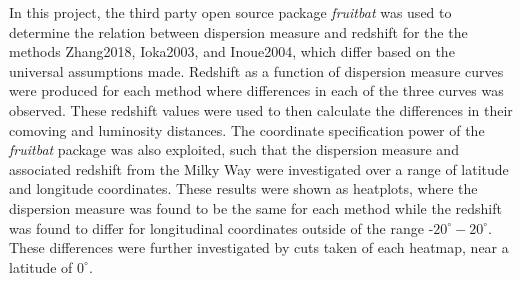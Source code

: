 \documentclass{article}
\begin{document}
In this project, the third party open source package \emph{fruitbat} was used to determine the relation between dispersion measure and redshift for the the methods Zhang2018, Ioka2003, and Inoue2004, which differ based on the universal assumptions made. Redshift as a function of dispersion measure curves were produced for each method where differences in each of the three curves was observed. These redshift values were used to then calculate the differences in their comoving and luminosity distances. The coordinate specification power of the \emph{fruitbat} package was also exploited, such that the dispersion measure and associated redshift from the Milky Way were investigated over a range of latitude and longitude coordinates. These results were shown as heatplots, where the dispersion measure was found to be the same for each method while the redshift was found to differ for longitudinal coordinates outside of the range -$20^\circ-20^\circ$. These differences were further investigated by cuts taken of each heatmap, near a latitude of $0^\circ$.



\end{document}
